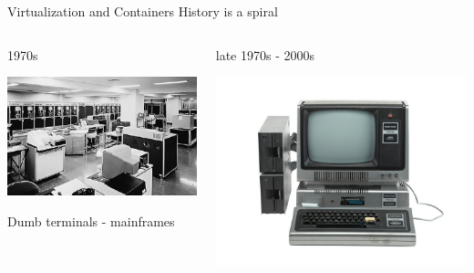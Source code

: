 \documentclass{beamer}
\begin{document}
\begin{frame}{Virtualization and Containers}
History is a spiral

\begin{columns}[T]
\begin{column}{.33\linewidth}
1970s

\includegraphics[width=\linewidth]{images/mainframe_1975}

Dumb terminals - mainframes
\end{column}

\begin{column}{.3\linewidth}
late 1970s - 2000s

\includegraphics[trim=0 9mm 0 9mm,clip, width=\linewidth]{images/trs-80}


\end{column}
\end{columns}
\end{frame}
\end{document}
